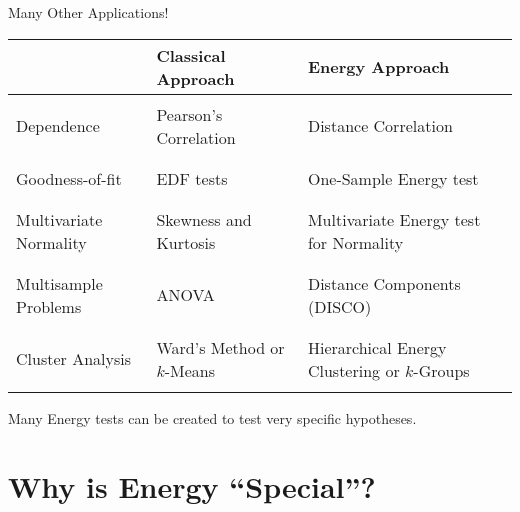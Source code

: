 \documentclass[presentation]{beamer}
\begin{document}
\begin{frame}{Many Other Applications!}
  \fontsize{7pt}{7.2}\selectfont
  \begin{tabular}[c]{lll}
    \hline
    & \textbf{Classical Approach} & \textbf{Energy Approach} \\
    \hline
    \\
    Dependence & Pearson's Correlation & Distance Correlation \\
    \\
    \hline
    \\
    Goodness-of-fit & EDF tests & One-Sample Energy test \\
    \\
    \hline
    \\
    Multivariate Normality & Skewness and Kurtosis & Multivariate Energy test for Normality \\
    \\
    \hline
    \\
    Multisample Problems & ANOVA & Distance Components (DISCO) \\
    \\
    \hline
    \\
    Cluster Analysis & Ward's Method or $k$-Means & Hierarchical Energy Clustering or $k$-Groups\\
    \\
    \hline
  \end{tabular}
  \begin{block}{}
    Many Energy tests can be created to test very specific hypotheses.
  \end{block}
\end{frame}

\section{Why is Energy ``Special''? }
\end{document}

